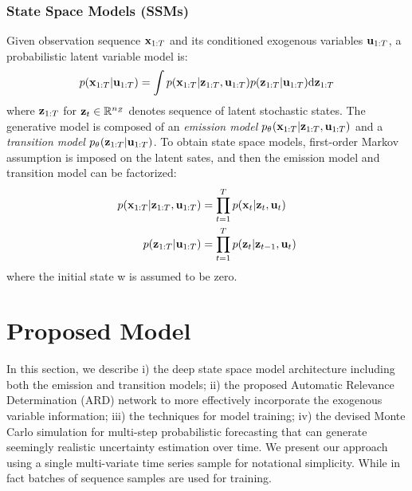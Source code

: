\documentclass{article}
\begin{document}
\subsubsection{State Space Models (SSMs)} Given observation sequence $\mathbf{x}_{1:T}$ and its conditioned exogenous variables $\mathbf{u}_{1:T}$, a probabilistic latent variable model is:
\begin{equation}
    p(\mathbf{x}_{1:T}|\mathbf{u}_{1:T}) = \int p(\mathbf{x}_{1:T}|\mathbf{z}_{1:T},\mathbf{u}_{1:T})p(\mathbf{z}_{1:T}|\mathbf{u}_{1:T})\mathrm{d}\mathbf{z}_{1:T}
\end{equation}\label{eq:LVM}
where $\mathbf{z}_{1:T}$ for $\mathbf{z}_t\in\mathbb{R}^{n_Z}$ denotes sequence of latent stochastic states. The generative model is composed of an \textit{emission model} $p_{\theta_{}}(\mathbf{x}_{1:T}|\mathbf{z}_{1:T},\mathbf{u}_{1:T})$ and a \textit{transition model} $p_{\theta_{}}(\mathbf{z}_{1:T}|\mathbf{u}_{1:T})$. To obtain state space models, first-order Markov assumption is imposed on the latent sates, and then the emission model and transition model can be factorized:
\begin{equation}\label{eq:ssm_fact}
    \begin{split}
        p(\mathbf{x}_{1:T}|\mathbf{z}_{1:T},\mathbf{u}_{1:T}) &= \prod_{t=1}^{T}p(\mathbf{x}_t|  \mathbf{z}_t, \mathbf{u}_t) \\
        p(\mathbf{z}_{1:T}|\mathbf{u}_{1:T}) & = \prod_{t=1}^{T}p(\mathbf{z}_t|\mathbf{z}_{t-1},\mathbf{u}_t)
    \end{split}
\end{equation}
where the initial state w is assumed to be zero. 

\section{Proposed Model}
In this section, we describe i) the deep state space model architecture including both the emission and transition models; ii) the proposed Automatic Relevance Determination (ARD) network to more effectively incorporate the exogenous variable information; iii) the techniques for model training; iv) the devised Monte Carlo simulation for multi-step probabilistic forecasting that can generate seemingly realistic uncertainty estimation over time. We present our approach using a single multi-variate time series sample for notational simplicity. While in fact batches of sequence samples are used for training.
\end{document}
